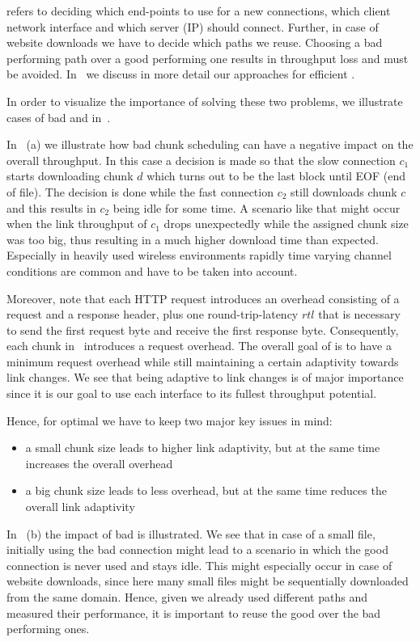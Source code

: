  refers to deciding which end-points to use for a new connections, \ie which client network interface and which server (IP) should connect.
Further, in case of website downloads we have to decide which paths we reuse. 
Choosing a bad performing path over a good performing one results in throughput loss and must be avoided. 
In~ we discuss in more detail our approaches for efficient .

In order to visualize the importance of solving these two problems, we illustrate cases of bad  and  in~. 

In~ (a) we illustrate how bad chunk scheduling can have a negative impact on the overall throughput. 
In this case a decision is made so that the slow connection $c_1$ starts downloading chunk $d$ which turns out to be the last block until EOF (end of file).
The decision is done while the fast connection $c_2$ still downloads chunk $c$ and this results in $c_2$ being idle for some time. 
A scenario like that might occur when the link throughput of $c_1$ drops unexpectedly while the assigned chunk size was too big, thus resulting in a much higher download time than expected. 
Especially in heavily used wireless environments rapidly time varying channel conditions are common and have to be taken into account.

Moreover, note that each HTTP request introduces an overhead consisting of a request and a response header, plus one round-trip-latency $rtl$ that is necessary to send the first request byte and receive the first response byte. 
Consequently, each chunk in \mhttp~introduces a request overhead. 
The overall goal of  is to have a minimum request overhead while still maintaining a certain adaptivity towards link changes. 
We see that being adaptive to link changes is of major importance since it is our goal to use each interface to its fullest throughput potential. 

Hence, for optimal  we have to keep two major key issues in mind:

\begin{itemize}
\item a small chunk size leads to higher link adaptivity, but at the same time increases the overall overhead
\item a big chunk size leads to less overhead, but at the same time reduces the overall link adaptivity
\end{itemize}

In~ (b) the impact of bad  is illustrated. 
We see that in case of a small file, initially using the bad connection might lead to a scenario in which the good connection is never used and stays idle. 
This might especially occur in case of website downloads, since here many small files might be sequentially downloaded from the same domain. 
Hence, given we already used different paths and measured their performance, it is important to reuse the good over the bad performing ones. 
